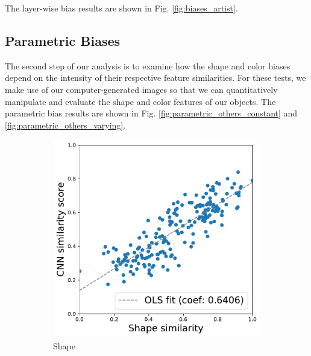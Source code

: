 The layer-wise bias results are shown in Fig. \ref{fig:biases_artist}.

\subsection{Parametric Biases}
The second step of our analysis is to examine how the shape and color biases depend on the intensity
of their respective feature similarities. For these tests, we make use of our computer-generated
images so that we can quantitatively manipulate and evaluate the shape and color features of our
objects. The parametric bias results are shown in Fig. \ref{fig:parametric_others_constant} and
\ref{fig:parametric_others_varying}.
\begin{figure}[h!]
    \begin{center}
        \begin{subfigure}[b]{0.235\textwidth}
            \includegraphics[width=\linewidth]{figures/vgg_shape_parametric_others_constant.pdf}
            \caption{Shape}
        \end{subfigure}
        \begin{subfigure}[b]{0.235\textwidth}

\end{subfigure}
\end{center}
\end{figure}
